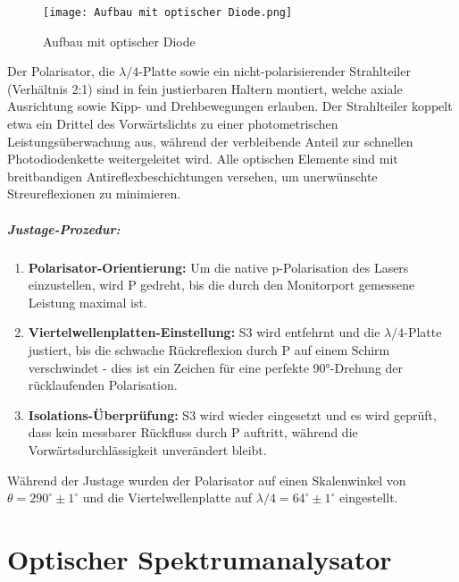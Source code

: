 \begin{figure}[htbp]
  \centering
  \texttt{[image: Aufbau mit optischer Diode.png]}
  \caption{Aufbau mit optischer Diode \cite{praktikum}}
  \label{fig:aufbau_mit_optischer_diode}
\end{figure}

Der Polarisator, die $\lambda/4$-Platte sowie ein nicht-polarisierender Strahlteiler (Verhältnis 2:1) sind in fein justierbaren Haltern montiert, welche axiale Ausrichtung sowie Kipp- und Drehbewegungen erlauben. 
Der Strahlteiler koppelt etwa ein Drittel des Vorwärtslichts zu einer photometrischen Leistungsüberwachung aus, während der verbleibende Anteil zur schnellen Photodiodenkette weitergeleitet wird. 
Alle optischen Elemente sind mit breitbandigen Antireflexbeschichtungen versehen, um unerwünschte Streureflexionen zu minimieren.

\paragraph{Justage-Prozedur:}
\begin{enumerate}
  \item \textbf{Polarisator-Orientierung:} Um die native p-Polarisation des Lasers einzustellen, wird P gedreht, bis die durch den Monitorport gemessene Leistung maximal ist.
  \item \textbf{Viertelwellenplatten-Einstellung:} S3 wird entfehrnt und  die $\lambda/4$-Platte justiert, bis die schwache Rückreflexion durch P auf einem Schirm verschwindet - dies ist ein Zeichen für eine perfekte 90°-Drehung der rücklaufenden Polarisation.
  \item \textbf{Isolations-Überprüfung:} S3 wird wieder eingesetzt und es wird geprüft, dass kein messbarer Rückfluss durch P auftritt, während die Vorwärtsdurchlässigkeit unverändert bleibt.  
\end{enumerate}

Während der Justage wurden der Polarisator auf einen Skalenwinkel von $\theta = 290^\circ \pm 1^\circ$ und die Viertelwellenplatte auf $\lambda/4 = 64^\circ \pm 1^\circ$ eingestellt.


\chapter{Optischer Spektrumanalysator} \label{sec:5.7}

